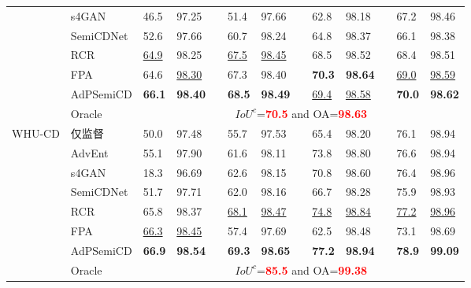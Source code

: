 \documentclass[lang=chs, degree=master, blindreview=false, adobe=false]{yanputhesis}
\begin{document}
\begin{table}[!htbp]
{\begin{tabular}{p{20mm}p{25mm}p{8mm}p{8mm}cp{8mm}p{8mm}cp{8mm}p{8mm}cp{8mm}p{8mm}}
      & s4GAN\cite{mittal2019semi}& 46.5 & 97.25 && 51.4 & 97.66 && 62.8 & 98.18 && 67.2 & 98.46 \\
      & SemiCDNet\cite{peng2021SemiCDNet} & 52.6 & 97.66 && 60.7 & 98.24 && 64.8 & 98.37 && 66.1 & 98.38 \\ %
      & RCR\cite{bandara2022RCR}& \underline{64.9} & 98.25 && \underline{67.5} & \underline{98.45} && 68.5 & 98.52 && 68.4 & 98.51 \\
      & FPA\cite{Zhang2023FPA}& 64.6 & \underline{98.30} && 67.3 & 98.40 && \cellcolor{mycyan}\textbf{70.3} & \cellcolor{mycyan}\textbf{98.64} && \underline{69.0} & \underline{98.59} \\
      \rowcolor{mycyan}
      \multirow{-8}{*}{\cellcolor{white}}& \cellcolor{white}AdPSemiCD   &   \textbf{66.1} & \textbf{98.40} && \textbf{68.5} & \textbf{98.49} && \cellcolor{white}\underline{69.4} & \cellcolor{white}\underline{98.58} && \textbf{70.0} & \textbf{98.62} \\%
      \cline{2-13}
      & Oracle & \multicolumn{11}{c}{$ IoU^c$=\textcolor{red}{\bf 70.5} and OA=\textcolor{red}{\bf 98.63}} \\
      \bottomrule
      \multirow{8}{*}{WHU-CD}
      & 仅监督   &   50.0 & 97.48 && 55.7 & 97.53 && 65.4 & 98.20 && 76.1 & 98.94 \\ %
      & AdvEnt\cite{vu2019advent}& 55.1 & 97.90 && 61.6 & 98.11 && 73.8 & 98.80 && 76.6 & 98.94 \\ %
      & s4GAN\cite{mittal2019semi}& 18.3 & 96.69 && 62.6 & 98.15 && 70.8 & 98.60 && 76.4 & 98.96 \\
      & SemiCDNet\cite{peng2021SemiCDNet} & 51.7 & 97.71 && 62.0 & 98.16 && 66.7 & 98.28 && 75.9 & 98.93 \\ %
      & RCR\cite{bandara2022RCR}& 65.8 & 98.37 && \underline{68.1} & \underline{98.47} && \underline{74.8} & \underline{98.84} && \underline{77.2} & \underline{98.96} \\
      & FPA\cite{Zhang2023FPA}& \underline{66.3} & \underline{98.45} && 57.4 & 97.69 && 62.5 & 98.48 && 73.1 & 98.69 \\
      \rowcolor{mycyan}
      \multirow{-8}{*}{\cellcolor{white}}& \cellcolor{white}AdPSemiCD   &   \textbf{66.9} & \textbf{98.54} && \textbf{69.3} & \textbf{98.65} && \textbf{77.2} & \textbf{98.94} && \textbf{78.9} & \textbf{99.09} \\%
      \cline{2-13}
      & Oracle & \multicolumn{11}{c}{$ IoU^c$=\textcolor{red}{\bf 85.5} and OA=\textcolor{red}{\bf 99.38}} \\

\end{tabular}}
\end{table}
\end{document}
